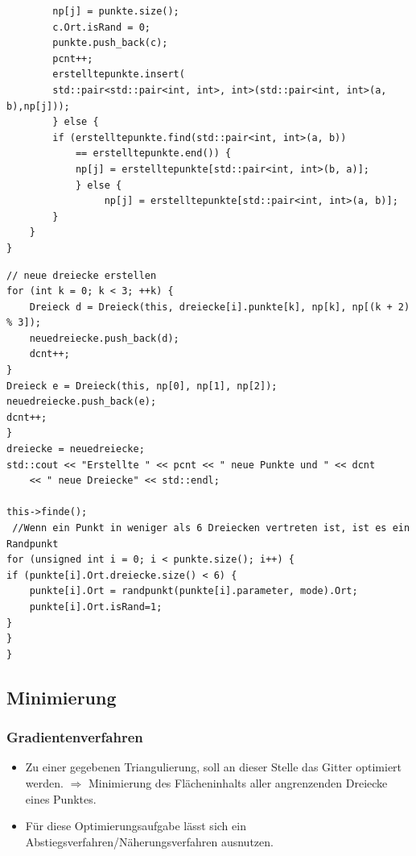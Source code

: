 \documentclass{beamer}
\begin{document}
\begin{frame}[fragile]
\begin{lstlisting}
        np[j] = punkte.size();
        c.Ort.isRand = 0;
        punkte.push_back(c);
        pcnt++;
        erstelltepunkte.insert(
        std::pair<std::pair<int, int>, int>(std::pair<int, int>(a, b),np[j]));
        } else {
        if (erstelltepunkte.find(std::pair<int, int>(a, b))
            == erstelltepunkte.end()) {
            np[j] = erstelltepunkte[std::pair<int, int>(b, a)];
            } else {
                 np[j] = erstelltepunkte[std::pair<int, int>(a, b)];
        }
    }
}
\end{lstlisting}
\end{frame}

\begin{frame}[fragile]
\begin{lstlisting}
// neue dreiecke erstellen
for (int k = 0; k < 3; ++k) {
    Dreieck d = Dreieck(this, dreiecke[i].punkte[k], np[k], np[(k + 2) % 3]);
    neuedreiecke.push_back(d);
    dcnt++;
}
Dreieck e = Dreieck(this, np[0], np[1], np[2]);
neuedreiecke.push_back(e);
dcnt++;
}
dreiecke = neuedreiecke;
std::cout << "Erstellte " << pcnt << " neue Punkte und " << dcnt
    << " neue Dreiecke" << std::endl;

this->finde();
 //Wenn ein Punkt in weniger als 6 Dreiecken vertreten ist, ist es ein Randpunkt
for (unsigned int i = 0; i < punkte.size(); i++) {
if (punkte[i].Ort.dreiecke.size() < 6) {
    punkte[i].Ort = randpunkt(punkte[i].parameter, mode).Ort;
    punkte[i].Ort.isRand=1;
}
}
}
\end{lstlisting}
\end{frame}
\subsection{Minimierung}

\begin{frame}
\frametitle{Gradientenverfahren}
\begin{itemize}
\item Zu einer gegebenen Triangulierung, soll an dieser Stelle das Gitter optimiert werden. $\Longrightarrow$ Minimierung des Flächeninhalts aller angrenzenden Dreiecke eines Punktes.
\item Für diese Optimierungsaufgabe lässt sich ein Abstiegsverfahren/Näherungsverfahren ausnutzen.
\end{itemize}  
\end{frame}
\end{document}
